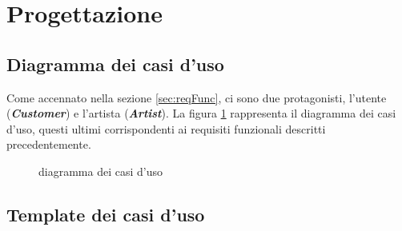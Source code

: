 \documentclass{article}
\begin{document}
  \section{Progettazione}

  \subsection{Diagramma dei casi d'uso}

  Come accennato nella sezione \ref{sec:reqFunc}, ci sono due protagonisti, l'utente (\textbf{\textit{Customer}}) e l'artista (\textbf{\textit{Artist}}). La figura \ref{fig:useCaseDiagram} rappresenta il diagramma dei casi d'uso, questi ultimi corrispondenti ai requisiti funzionali descritti precedentemente.

  \begin{figure}[H]
    \centering
    
    \caption{diagramma dei casi d'uso}
    \label{fig:useCaseDiagram}
  \end{figure}

  \subsection{Template dei casi d'uso}
\end{document}
